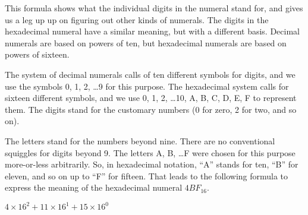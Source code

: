 This formula shows what the individual digits in the numeral stand for,
and gives us a leg up up on figuring out other kinds of numerals.
The digits in the hexadecimal numeral have a similar meaning,
but with a different basis. Decimal numerals are based on
powers of ten, but hexadecimal numerals are based on powers of sixteen.

The system of decimal numerals calls of ten different symbols for digits,
and we use the symbols 0, 1, 2, \dots 9 for this purpose.
The hexadecimal system calls for sixteen different symbols,
and we use 0, 1, 2, \dots 10, A, B, C, D, E, F to represent them.
The digits stand for the customary numbers (0 for zero, 2 for two,
and so on).

The letters stand for the numbers beyond nine.
There are no conventional squiggles for digits beyond 9.
The letters A, B, \dots F were chosen for this purpose more-or-less arbitrarily.
So, in hexadecimal notation, ``A'' stands for ten, ``B'' for eleven,
and so on up to ``F'' for fifteen. That leads to the following
formula to express the meaning of the hexadecimal numeral $4BF_{16}$.
\begin{center}
$4 \times 16^2 + 11 \times 16^1 + 15 \times 16^0$
\end{center}


